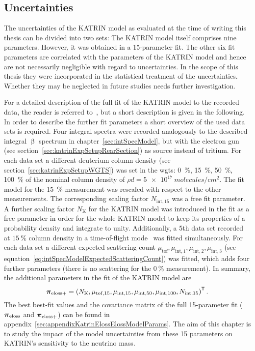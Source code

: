 \subsection{Uncertainties}
The uncertainties of the KATRIN model as evaluated at the time of writing this thesis can be divided into two sets: The KATRIN model itself comprises nine parameters. However, it was obtained in a 15-parameter fit. The other six fit parameters are correlated with the parameters of the KATRIN model and hence are not necessarily negligible with regard to uncertainties. In the scope of this thesis they were incorporated in the statistical treatment of the uncertainties. Whether they may be neglected in future studies needs further investigation. 

For a detailed description of the full fit of the KATRIN model to the recorded data, the reader is referred to~\cite{Hannen2019_1}, but a short description is given in the following. In order to describe the further fit parameters a short overview of the used data sets is required. Four integral spectra were recorded analogously to the described integral $\upbeta$ spectrum in chapter~\ref{sec:intSpecModel}, but with the electron gun (see section~\ref{sec:katrinExpSetupRearSection}) as source instead of tritium. For each data set a different deuterium column density (see section~\ref{sec:katrinExpSetupWGTS}) was set in the \gls{wgts}: \SI{0}{\percent}, \SI{15}{\percent}, \SI{50}{\percent}, \SI{100}{\percent} of the nominal column density of $\rho d = \SI{5e17}{molecules/cm^2}$. The fit model for the \mbox{\SI{15}{\percent}-measurement} was rescaled with respect to the other measurements. The corresponding scaling factor $N_{\mathrm{int},15}$ was a free fit parameter. A further scaling factor $N_\mathrm{K}$ for the KATRIN model was introduced in the fit as a free parameter in order for the whole KATRIN model to keep its properties of a probability density and integrate to unity. Additionally, a 5th data set recorded at $\SI{15}{\percent}$ column density in a time-of-flight mode~\cite{Bonn1999} was fitted simultaneously. For each data set a different expected scattering count $\mu_\mathrm{tof}, \mu_{\mathrm{int},1}, \mu_{\mathrm{int},2}, \mu_{\mathrm{int},3}$ (see equation~\ref{eq:intSpecModelExpectedScatteringCount}) was fitted, which adds four further parameters (there is no scattering for the $\SI{0}{\percent}$ measurement). In summary, the additional parameters in the fit of the KATRIN model are
\begin{equation}
\label{eq:katrinElossElossModelExtendedParams}
	\boldsymbol{\mathbf{\pi}}_\mathrm{eloss+} = 
	{\left(
		N_\mathrm{K},
		\mu_{\mathrm{tof},15},
		\mu_{\mathrm{int},15}, 
		\mu_{\mathrm{int},50}, 
		\mu_{\mathrm{int},100},
		N_{\mathrm{int},15}
		\right)}^{\mathsf{T}}
	\text{\,.}
\end{equation}
The best best-fit values and the covariance matrix of the full 15-parameter fit ($\boldsymbol{\mathbf{\pi}}_\mathrm{eloss}$ and $\boldsymbol{\mathbf{\pi}}_\mathrm{eloss+}$) can be found in appendix~\ref{sec:appendixKatrinElossElossModelParams}. The aim of this chapter is to study the impact of the model uncertainties from these 15 parameters on KATRIN's sensitivity to the neutrino mass.

